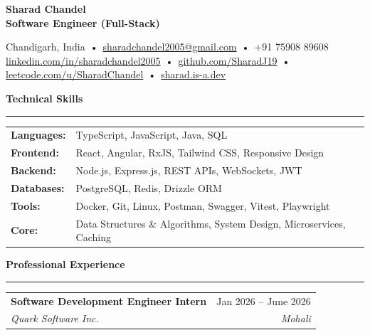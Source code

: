 \documentclass[10pt, letterpaper]{article}
\makeatletter
\newcommand{\resumesection}[1]{
\vspace{6pt}
{\normalsize \textbf{\textcolor{accent}{#1}}}
\vspace{2pt}
\hrule
\vspace{3pt}
}
\newcommand{\experience}[4]{
\begin{tabularx}
	{\textwidth}{@{} X r @{}} \textbf{#1} & #2 \\ \textit{#3} & \textit{#4} \\
\end{tabularx}
\vspace{-2pt}
}
\makeatother
\begin{document}
	\begin{center}
		{\Large \textbf{Sharad Chandel}} \\[2pt] {\normalsize \textbf{Software Engineer (Full-Stack)}}
		\vspace{5pt}

		\small {} Chandigarh, India \,•\,  \href{mailto:sharadchandel2005@gmail.com}{sharadchandel2005@gmail.com}
		\,•\,  +91 75908 89608 \\[2.5pt] 
		\href{https://linkedin.com/in/sharadchandel2005}{linkedin.com/in/sharadchandel2005}
		\,•\,  \href{https://github.com/SharadJ19}{github.com/SharadJ19}
		\,•\, 
		\href{https://leetcode.com/u/SharadChandel}{leetcode.com/u/SharadChandel} \,•\,
		 \href{https://sharad.is-a.dev}{sharad.is-a.dev}
	\end{center}

	\vspace{3pt}

	\resumesection{Technical Skills}

	\begin{tabularx}
		{\textwidth}{@{} >{\bfseries}l X @{}} Languages: & TypeScript, JavaScript, Java,
		SQL \\ Frontend: & React, Angular, RxJS, Tailwind CSS, Responsive Design \\ Backend:
		& Node.js, Express.js, REST APIs, WebSockets, JWT \\ Databases: & PostgreSQL,
		Redis, Drizzle ORM \\ Tools: & Docker, Git, Linux, Postman, Swagger, Vitest,
		Playwright \\ Core: & Data Structures \& Algorithms, System Design, Microservices,
		Caching \\
	\end{tabularx}

	\resumesection{Professional Experience}

	\experience{Software Development Engineer Intern}{Jan 2026 -- June 2026}
	{Quark Software Inc.}{Mohali}
\end{document}
